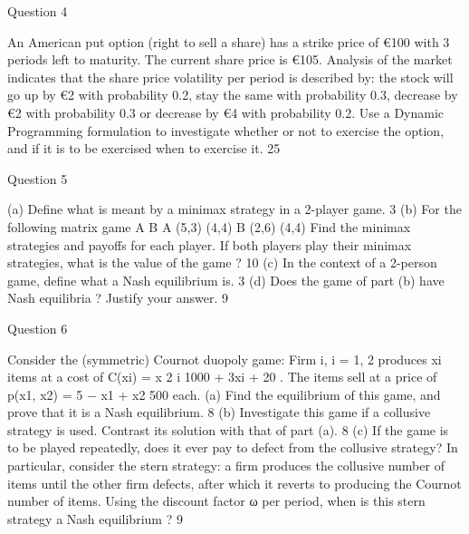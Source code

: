 Question 4 

An American put option (right to sell a share) has a strike price of €100
with 3 periods left to maturity. The current share price is €105. Analysis
of the market indicates that the share price volatility per period is described
by: the stock will go up by €2 with probability 0.2, stay the same with
probability 0.3, decrease by €2 with probability 0.3 or decrease by €4 with
probability 0.2.
Use a Dynamic Programming formulation to investigate whether or not to
exercise the option, and if it is to be exercised when to exercise it. 25 %

Question 5 

(a) Define what is meant by a minimax strategy in a 2-player game. 3 %
(b) For the following matrix game
A B
A (5,3) (4,4)
B (2,6) (4,4)
Find the minimax strategies and payoffs for each player. If both players
play their minimax strategies, what is the value of the game ? 10 %
(c) In the context of a 2-person game, define what a Nash equilibrium is. 3 %
(d) Does the game of part (b) have Nash equilibria ? Justify your answer. 9 %


Question 6 

Consider the (symmetric) Cournot duopoly game: Firm i, i = 1, 2 produces
xi
items at a cost of
C(xi) = x
2
i
1000 + 3xi + 20
. The items sell at a price of
p(x1, x2) = 5 −
x1 + x2
500
each.
(a) Find the equilibrium of this game, and prove that it is a Nash equilibrium.
8 %
(b) Investigate this game if a collusive strategy is used. Contrast its solution
with that of part (a). 8 %
(c) If the game is to be played repeatedly, does it ever pay to defect from
the collusive strategy? In particular, consider the stern strategy: a firm
produces the collusive number of items until the other firm defects,
after which it reverts to producing the Cournot number of items. Using
the discount factor ω per period, when is this stern strategy a Nash
equilibrium ? 9 %


